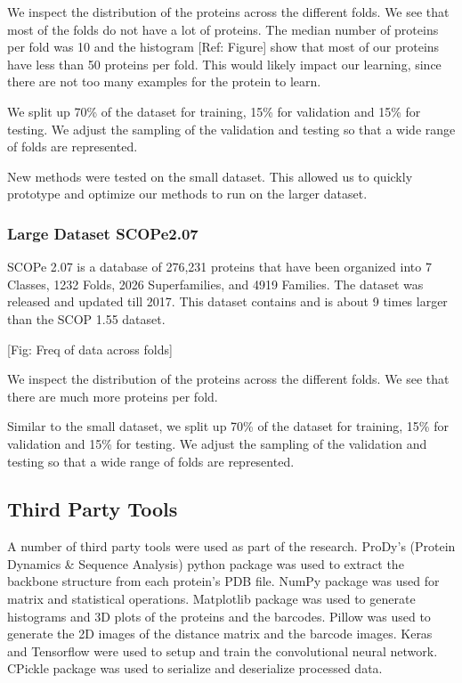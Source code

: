 \documentclass[12pt, a4paper, twocolumn, fullpage]{article}
\theoremstyle{plain}
\theoremstyle{definition}
\theoremstyle{remark}
\begin{document}
We inspect the distribution of the proteins across the different folds. We see that most of the folds do not have a lot of proteins. The median number of proteins per fold was 10 and the histogram [Ref: Figure] show that most of our proteins have less than 50 proteins per fold. This would likely impact our learning, since there are not too many examples for the protein to learn.

We split up 70\% of the dataset for training, 15\% for validation and 15\% for testing. We adjust the sampling of the validation and testing so that a wide range of folds are represented.

New methods were tested on the small dataset. This allowed us to quickly prototype and optimize our methods to run on the larger dataset.

\subsubsection{Large Dataset SCOPe2.07}

SCOPe 2.07 is a database of 276,231 proteins that have been organized into 7 Classes, 1232 Folds, 2026 Superfamilies, and 4919 Families. The dataset was released and updated till 2017. This dataset contains and is about 9 times larger than the SCOP 1.55 dataset.

[Fig: Freq of data across folds]

We inspect the distribution of the proteins across the different folds. We see that there are much more proteins per fold.

Similar to the small dataset, we split up 70\% of the dataset for training, 15\% for validation and 15\% for testing. We adjust the sampling of the validation and testing so that a wide range of folds are represented.
	
\subsection{Third Party Tools}

A number of third party tools were used as part of the research. ProDy's (Protein Dynamics \& Sequence Analysis) python package was used to extract the backbone structure from each protein's PDB file. NumPy package was used for matrix  and statistical operations. Matplotlib package was used to generate histograms and 3D plots of the proteins and the barcodes. Pillow was used to generate the 2D images of the distance matrix and the barcode images. Keras and Tensorflow were used to setup and train the convolutional neural network. CPickle package was used to serialize and deserialize processed data.
	
\end{document}

